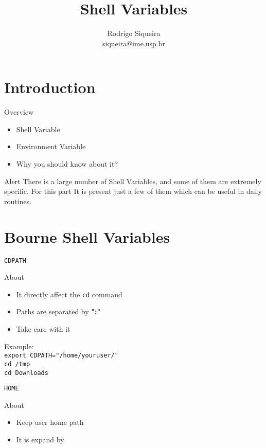 \documentclass[10pt, compress, aspectratio=169]{beamer}
\title{Shell Variables}
\author{\footnotesize Rodrigo Siqueira \\ {\scriptsize siqueira@ime.usp.br}}
\begin{document}
\maketitle

\section{Introduction}
\begin{frame}{Overview}
  \begin{itemize}
    \item Shell Variable
    \item Environment Variable
    \item Why you should know about it?
  \end{itemize}
  \begin{alertblock}{Alert}
    There is a large number of Shell Variables, and some of them are extremely
    specific. For this part It is present just a few of them which can be
    useful in daily routines.
  \end{alertblock}
\end{frame}

\section{Bourne Shell Variables}
\begin{frame}{\texttt{CDPATH}}
  \begin{exampleblock}{About}
    \begin{itemize}
      \item It directly affect the \texttt{cd} command
      \item Paths are separated by \textbf{":"}
      \item Take care with it
    \end{itemize}
  \end{exampleblock}
  Example: \\
  \texttt{export CDPATH="/home/youruser/"}\\
  \texttt{cd /tmp}\\
  \texttt{cd Downloads}
\end{frame}

\begin{frame}{\texttt{HOME}}
  \begin{exampleblock}{About}
    \begin{itemize}
      \item Keep user home path
      \item It is expand by \texttt{~}
    \end{itemize}
  \end{exampleblock}
\end{frame}
\end{document}
